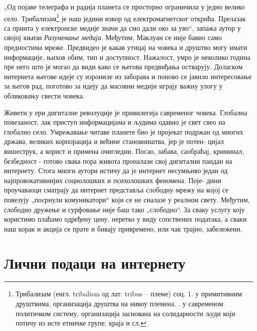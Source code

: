\documentclass[a4paper]{article}
\begin{document}
„Од појаве телеграфа и радија планета се просторно ограничила у једно велико село. Трибализам\footnote{Трибализам (енгл. tribalism од лат. tribus – племе) соц. 1. у примитивним друштвима, организација друштва на нивоу племена.
. у савременом политичком систему, организација заснована на солидарности људи који потичу из исте етничке групе, краја и
сл.} је наш једини извор од електромагнетског открића. Прелазак са принта у електронске медије значи да смо дали око за уво“, запажа аутор у својој књизи \emph{Разумевање медија}. Међутим, Маклуан се није бавио само предностима мреже. Предвидео је какав утицај на човека и друштво могу имати информације, њихов обим, тип и доступност. Нажалост, умро је неколико година пре него што је могао да види како се његова предвиђања остварују. Доласком интернета његове идеје су изрониле из заборава и поново се јавило интересовање за његов рад, поготово за идеју да масовни медији играју важну улогу у обликовању свести човека.

Живети у ери дигиталне револуције је привилегија савременог човека. Глобална повезаност, лак приступ информацијама и људима одавно је свет свео на глобално село. Умрежавање читаве планете био је пројекат подржан од многих држава, великих корпорација и већине становништва, јер је потен-
цијал вишеструк, а корист и примена очигледни. Посао, забава, саобраћај, криминал, безбедност - готово свака пора живота проналази свој дигитални пандан на интернету. Стога многи аутори истичу да је интернет несумњиво један од најпровокативнијих социолошких и психолошких феномена. Поје-
дини проучаваоци сматрају да интернет представља слободну мрежу на којој се повезују „посрнули комуникатори“ који се не сналазе у реалном свету\cite{baltezarevic}. Међутим, слободно дружење и сурфовање није баш тако „слободно“. За сваку услугу коју користимо плаћамо одређену цену, неретко у виду сопствених података, а сваки наш корак и акција се прате и бивају привремено, или чак трајно, забележени.

\newpage
\section{Лични подаци на интернету}
\label{sec:naslov1} 
\end{document}

